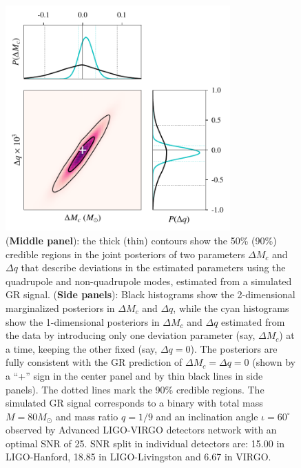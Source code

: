 \documentclass[prd,preprintnumbers,twocolumn,eqsecnum,floatfix,a4paper,nofootinbib,superscriptaddress]{revtex4}
\begin{document}
\begin{figure}[htb] \begin{center}
		\includegraphics[width=3.4in]{figs/hm_mcq_GR.pdf}
		\caption{(\textbf{Middle panel}): the thick (thin) contours show the 50\% (90\%) credible regions in the joint posteriors of two parameters $\Delta M_c$ and $\Delta q$ that describe deviations in the estimated parameters using the quadrupole and non-quadrupole modes, estimated from a simulated GR signal. (\textbf{Side panels}): Black histograms show the 2-dimensional marginalized posteriors in $\Delta M_c$ and $\Delta q$, while the cyan histograms show the 1-dimensional posteriors in $\Delta M_c$ and $\Delta q$ estimated from the data by introducing only one deviation parameter (say, $\Delta M_c$) at a time, keeping the other fixed (say, $\Delta q = 0$). The posteriors are fully consistent with the GR prediction of $\Delta M_c = \Delta q = 0$ (shown by a ``+'' sign in the center panel and by thin black lines in side panels). The dotted lines mark the 90\% credible regions. The simulated GR signal corresponds to a binary with total mass $M = {80}M_\odot$ and mass ratio $q = 1/9$ and an inclination angle $\iota = {60^\circ}$ observed by Advanced LIGO-VIRGO detectors network with an optimal SNR of 25. SNR split in individual detectors are: 15.00 in LIGO-Hanford, 18.85 in LIGO-Livingston and 6.67 in VIRGO. }
		\label{fig:posterior_BBH_GR_inj}
\end{center} \end{figure}
\end{document}
